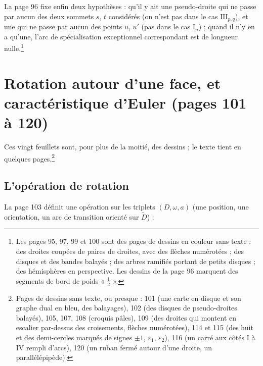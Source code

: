 \documentclass[11pt,a4paper]{article}
\begin{document}
La page 96 fixe enfin deux hypothèses : qu'il y ait une pseudo-droite qui ne
passe par aucun des deux sommets $s$, $t$ considérés (on n'est pas dans le cas
$\mathrm{III}_{p,q}$), et une qui ne passe par aucun des points $u$, $u'$ (pas
dans le cas $\mathrm{I}_n$) ; quand il n'y en a qu'une, l'arc de spécialisation
exceptionnel correspondant est de longueur nulle.\footnote{Les pages 95, 97, 99
et 100 sont des pages de dessins en couleur sans texte : des droites coupées
de paires de droites, avec des flèches numérotées ; des disques et des bandes
balayés ; des arbres ramifiés portant de petits disques ; des hémisphères en
perspective. Les dessins de la page 96 marquent des segments de bord de poids
« $\frac12$ ».}

\section*{Rotation autour d'une face, et caractéristique d'Euler (pages 101 à 120)}

Ces vingt feuillets sont, pour plus de la moitié, des dessins ; le texte tient
en quelques pages.\footnote{Pages de dessins sans texte, ou presque : 101 (une
carte en disque et son graphe dual en bleu, des balayages), 102 (des disques de
pseudo-droites balayés), 105, 107, 108 (croquis pâles), 109 (des droites qui
montent en escalier par-dessus des croisements, flèches numérotées), 114 et 115
(des huit et des demi-cercles marqués de signes $\pm 1$, $\varepsilon_1$,
$\varepsilon_2$), 116 (un carré aux côtés I à IV rempli d'arcs), 120 (un ruban
fermé autour d'une droite, un parallélépipède).}

\subsection*{L'opération de rotation}

La page 103 définit une opération sur les triplets $(D, \omega, a)$ (une
position, une orientation, un arc de transition orienté sur $\widetilde{D}$) :
\end{document}
